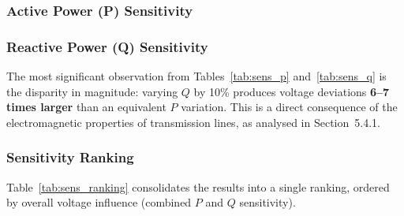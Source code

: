 \documentclass[12pt, a4paper]{article}
\begin{document}
\subsubsection{Active Power (P) Sensitivity}
\begin{table}[htbp]
\centering
\caption{System Response to $\pm 10\%$ Change in Active Power}
\label{tab:sens_p}
\end{table}

\subsubsection{Reactive Power (Q) Sensitivity}
\begin{table}[htbp]
\centering
\caption{System Response to $\pm 10\%$ Change in Reactive Power}
\label{tab:sens_q}
\end{table}

The most significant observation from Tables~\ref{tab:sens_p} and~\ref{tab:sens_q} is the disparity in magnitude: varying $Q$ by 10\% produces voltage deviations \textbf{6--7 times larger} than an equivalent $P$ variation. This is a direct consequence of the electromagnetic properties of transmission lines, as analysed in Section~5.4.1.

\subsubsection{Sensitivity Ranking}
Table~\ref{tab:sens_ranking} consolidates the results into a single ranking, ordered by overall voltage influence (combined $P$ and $Q$ sensitivity).
\end{document}
